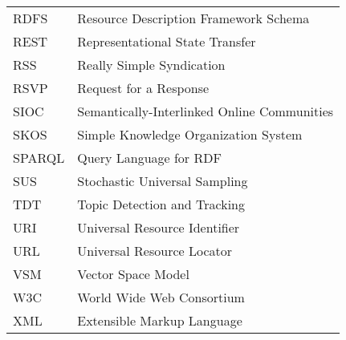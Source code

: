 \begin{longtable}{lp{9cm}}
 RDFS & Resource Description Framework Schema \\
 REST & Representational State Transfer\\
 RSS & Really Simple Syndication \\
 RSVP &  Request for a Response\\
 SIOC & Semantically-Interlinked Online Communities \\
 SKOS &  Simple Knowledge Organization System \\
 SPARQL & Query Language for RDF \\
 SUS & Stochastic Universal Sampling \\
 TDT & Topic Detection and Tracking\\
 URI & Universal Resource Identifier \\
 URL & Universal Resource Locator \\
 VSM & Vector Space Model \\
 W3C & World Wide Web Consortium \\
 XML & Extensible Markup Language 
\end{longtable}

